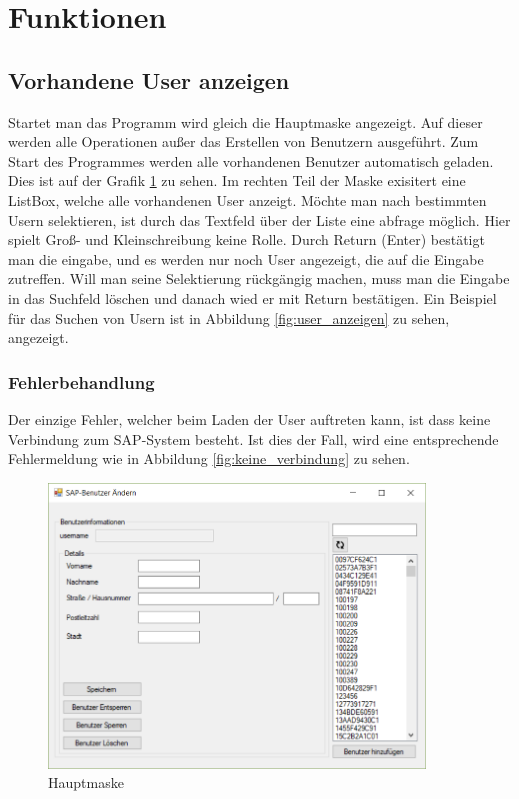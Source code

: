\section{Funktionen}

\subsection{Vorhandene User anzeigen}

Startet man das Programm wird gleich die Hauptmaske angezeigt. Auf dieser werden alle Operationen außer das Erstellen von Benutzern ausgeführt. 
Zum Start des Programmes werden alle vorhandenen Benutzer automatisch geladen. Dies ist auf der Grafik \ref{fig:main} zu sehen. Im rechten Teil der Maske exisitert eine ListBox, welche alle vorhandenen User anzeigt. 
Möchte man nach bestimmten Usern selektieren, ist durch das Textfeld über der Liste eine abfrage möglich. Hier spielt Groß- und Kleinschreibung keine Rolle. 
Durch Return (Enter) bestätigt man die eingabe, und es werden nur noch User angezeigt, die auf die Eingabe zutreffen. Will man seine Selektierung rückgängig machen, muss man die Eingabe in das Suchfeld löschen und danach wied er mit Return bestätigen.
Ein Beispiel für das Suchen von Usern ist in Abbildung \ref{fig:user_anzeigen} zu sehen, angezeigt.

\subsubsection{Fehlerbehandlung}

Der einzige Fehler, welcher beim Laden der User auftreten kann, ist dass keine Verbindung zum SAP-System besteht. Ist dies der Fall, wird eine entsprechende Fehlermeldung wie in Abbildung \ref{fig:keine_verbindung} zu sehen.

\begin{figure}[h]
	\begin{center}
		\includegraphics[width=10cm]{images/Main.png}
	\end{center}
	\caption{Hauptmaske}
	\label{fig:main}
\end{figure}

